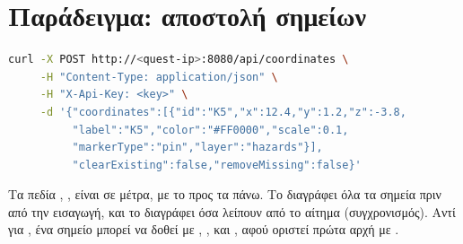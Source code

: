 \section{Παράδειγμα: αποστολή σημείων}

\begin{lstlisting}[language=bash,caption={Αποστολή σημείων με cURL.}]
curl -X POST http://<quest-ip>:8080/api/coordinates \
     -H "Content-Type: application/json" \
     -H "X-Api-Key: <key>" \
     -d '{"coordinates":[{"id":"K5","x":12.4,"y":1.2,"z":-3.8,
          "label":"K5","color":"#FF0000","scale":0.1,
          "markerType":"pin","layer":"hazards"}],
          "clearExisting":false,"removeMissing":false}'
\end{lstlisting}

Τα πεδία \code{x}, , \code{z} είναι σε μέτρα, με το \code{y} προς τα πάνω. Το  διαγράφει όλα τα σημεία πριν από την εισαγωγή, και το  διαγράφει όσα λείπουν από το αίτημα (συγχρονισμός). Αντί για , ένα σημείο μπορεί να δοθεί με , ,  και , αφού οριστεί πρώτα αρχή με .
